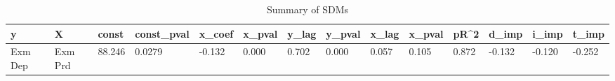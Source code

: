 \hspace{-1cm}
\begin{table}[h!]
\fontsize{8}{8}\selectfont %
\setlength{\tabcolsep}{2pt} %
\renewcommand{\arraystretch}{1.5} %
\begin{tabular}{|p{2cm}|p{2cm}|p{1cm}|p{2cm}|p{1cm}|p{1cm}|p{1cm}|p{1cm}|p{1cm}|p{1cm}|p{1cm}|p{1cm}|p{1cm}|p{1cm}|} %
\hline
y & X & const & const\_pval & x\_coef & x\_pval & y\_lag & y\_pval & x\_lag & x\_pval & pR\^{}2 & d\_imp & i\_imp & t\_imp \\
\hline
Exm Dep & Exm Prd & 88.246 & 0.0279 & -0.132 & 0.000 & 0.702 & 0.000 & 0.057 & 0.105 & 0.872 & -0.132 & -0.120 & -0.252 \\
\hline
\end{tabular}
\caption{Summary of SDMs}
\label{tab:summary_SDM}
\end{table}


